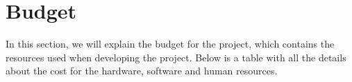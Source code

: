 	
	
\section{Budget}\label{sec:chap5_budg}

In this section, we will explain the budget for the project, which contains the resources used when developing the project. Below is a table with all the details about the cost for the hardware, software and human resources.\\

